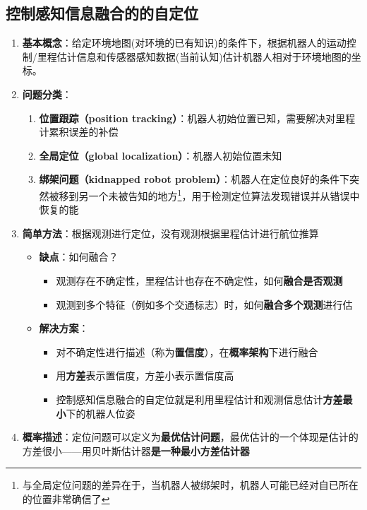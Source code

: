 \documentclass[../main.tex]{subfiles}
\begin{document}
\begin{enumerate}
\subsection{控制感知信息融合的的自定位}
\begin{enumerate}
    \item \textbf{基本概念}：给定环境地图(对环境的已有知识)的条件下，根据机器人的运动控制/里程估计信息和传感器感知数据(当前认知)估计机器人相对于环境地图的坐标。
    \item \textbf{问题分类}：
    \begin{enumerate}
        \item \textbf{位置跟踪（position tracking）}：机器人初始位置已知，需要解决对里程计累积误差的补偿
        \item \textbf{全局定位（global localization）}：机器人初始位置未知
        \item \textbf{绑架问题（kidnapped robot problem）}：机器人在定位良好的条件下突然被移到另一个未被告知的地方\footnote{与全局定位问题的差异在于，当机器人被绑架时，机器人可能已经对自已所在的位置非常确信了}，用于检测定位算法发现错误并从错误中恢复的能
    \end{enumerate}
    \item \textbf{简单方法}：根据观测进行定位，没有观测根据里程估计进行航位推算
        \begin{itemize}
            \item \textbf{缺点}：如何融合？
                \begin{itemize}
                    \item 观测存在不确定性，里程估计也存在不确定性，如何\textbf{融合是否观测}
                    \item 观测到多个特征（例如多个交通标志）时，如何\textbf{融合多个观测}进行估
                \end{itemize}
            \item \textbf{解决方案}：
                \begin{itemize}
                    \item 对不确定性进行描述（称为\textbf{置信度}），在\textbf{概率架构}下进行融合
                    \item 用\textbf{方差}表示置信度，方差小表示置信度高
                    \item 控制感知信息融合的自定位就是利用里程估计和观测信息估计\textbf{方差最小}下的机器人位姿
                \end{itemize}
        \end{itemize}
    \item \textbf{概率描述}：定位问题可以定义为\textbf{最优估计问题}，最优估计的一个体现是估计的方差很小——用贝叶斯估计器\textbf{是一种最小方差估计器}\\

\end{enumerate}
\end{enumerate}
\end{document}
